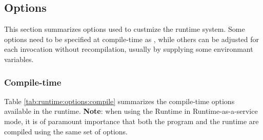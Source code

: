 \subsection{Options}
This section summarizes options used to custmize the runtime system. Some options need to be specified at compile-time as , while others can be adjusted for each invocation without recompilation, usually by supplying some environmant variables.

\subsubsection{Compile-time}
Table \ref{tab:runtime:options:compile} summarizes the compile-time options available in the runtime. \textbf{Note}: when using the Runtime in Runtime-as-a-service mode, it is of paramount importance that both the program and the runtime are compiled using the same set of options.
